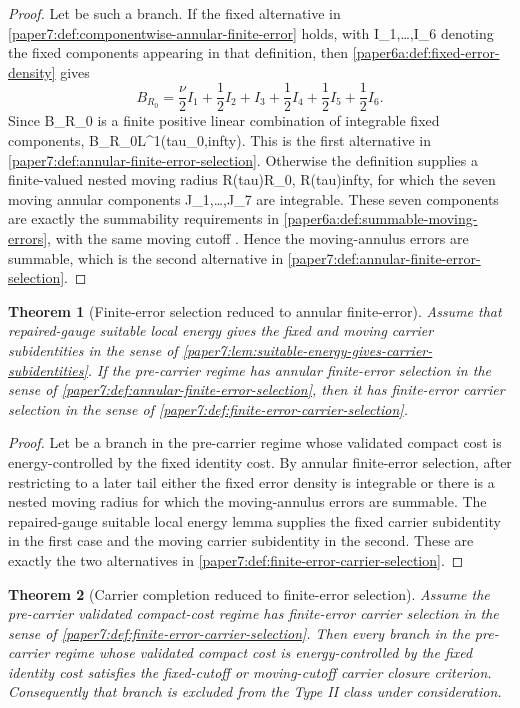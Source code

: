\documentclass[11pt]{amsart}
\def\({}%
\def\){}%
\def\tau{tau}%
\def\infty{infty}%
\theoremstyle{plain}
\newtheorem{theorem}{Theorem}[section]
\theoremstyle{definition}
\theoremstyle{remark}
\begin{document}
\begin{proof}
Let \(\omega\) be such a branch.  If the fixed alternative in
\cref{paper7:def:componentwise-annular-finite-error} holds, with
\(I_1,\ldots,I_6\) denoting the fixed components appearing in that definition,
then
\cref{paper6a:def:fixed-error-density} gives
\[
  B_{R_0}
  =
  \frac{\nu}{2}I_1+\frac12 I_2+I_3+\frac12 I_4+\frac12 I_5+\frac12 I_6 .
\]
Since \(B_{R_0}\) is a finite positive linear combination of integrable fixed
components, \(B_{R_0}\in L^1(\tau_0,\infty)\).  This is the first alternative
in \cref{paper7:def:annular-finite-error-selection}.
Otherwise the definition supplies a finite-valued nested moving radius
\(R(\tau)\ge R_0\), \(R(\tau)\to\infty\), for which the seven moving annular
components \(J_1,\ldots,J_7\) are integrable.  These seven components are
exactly the summability requirements in
\cref{paper6a:def:summable-moving-errors}, with the same moving cutoff
\(\Phi\).  Hence the moving-annulus errors are summable, which is the second
alternative in \cref{paper7:def:annular-finite-error-selection}.
\end{proof}

\begin{theorem}[Finite-error selection reduced to annular finite-error]
\label{paper7:thm:finite-error-selection-reduced-to-annular}
Assume that repaired-gauge suitable local energy gives the fixed and moving
carrier subidentities in the sense of
\cref{paper7:lem:suitable-energy-gives-carrier-subidentities}.  If the
pre-carrier regime has annular finite-error selection in the sense of
\cref{paper7:def:annular-finite-error-selection}, then it has finite-error
carrier selection in the sense of
\cref{paper7:def:finite-error-carrier-selection}.
\end{theorem}

\begin{proof}
Let \(\omega\) be a branch in the pre-carrier regime whose validated compact
cost is energy-controlled by the fixed identity cost.  By annular finite-error
selection, after restricting to a later tail either the fixed error density is
integrable or there is a nested moving radius for which the moving-annulus
errors are summable.  The repaired-gauge suitable local energy lemma supplies
the fixed carrier subidentity in the first case and the moving carrier
subidentity in the second.  These are exactly the two alternatives in
\cref{paper7:def:finite-error-carrier-selection}.
\end{proof}

\begin{theorem}[Carrier completion reduced to finite-error selection]
\label{paper7:thm:carrier-completion-reduced-to-finite-error}
Assume the pre-carrier validated compact-cost regime has finite-error carrier
selection in the sense of
\cref{paper7:def:finite-error-carrier-selection}.  Then every branch in the
pre-carrier regime whose validated compact cost is energy-controlled by the
fixed identity cost satisfies the fixed-cutoff or moving-cutoff carrier closure
criterion.  Consequently that branch is excluded from the Type II class under
consideration.
\end{theorem}
\end{document}
